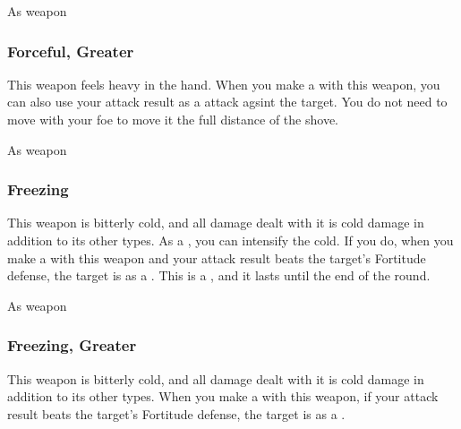  


 As weapon


\lowercase{\hypertarget{item:Forceful, Greater}{}}\label{item:Forceful, Greater}
\hypertarget{item:Forceful, Greater}{\subsubsection{Forceful, Greater\hfill{}}}

This weapon feels heavy in the hand.
When you make a  with this weapon, you can also use your attack result as a  attack agsint the target.
You do not need to move with your foe to move it the full distance of the shove.



 


 As weapon


\lowercase{\hypertarget{item:Freezing}{}}\label{item:Freezing}
\hypertarget{item:Freezing}{\subsubsection{Freezing\hfill{}}}

This weapon is bitterly cold, and all damage dealt with it is cold damage in addition to its other types.
As a , you can intensify the cold.
If you do, when you make a  with this weapon and your attack result beats the target's Fortitude defense, the target is \fatigued as a .
This is a , and it lasts until the end of the round.



 


 As weapon


\lowercase{\hypertarget{item:Freezing, Greater}{}}\label{item:Freezing, Greater}
\hypertarget{item:Freezing, Greater}{\subsubsection{Freezing, Greater\hfill{}}}

This weapon is bitterly cold, and all damage dealt with it is cold damage in addition to its other types.
When you make a  with this weapon, if your attack result beats the target's Fortitude defense, the target is \fatigued as a .



